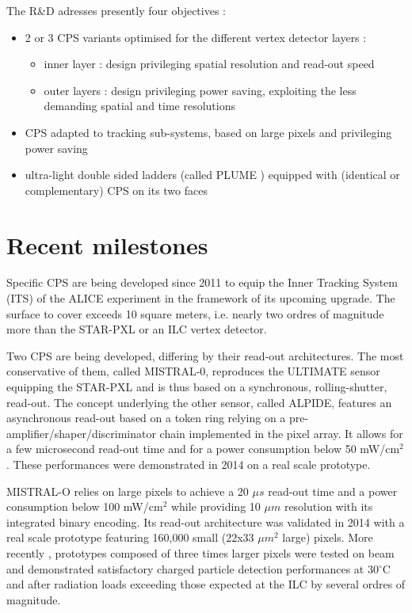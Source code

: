 \documentclass[11pt,a4paper,twosided]{article}
\begin{document}
  The R\&D adresses presently four objectives :
\begin{itemize}
\item 2 or 3 CPS variants optimised for the different vertex detector layers :
\begin{itemize}
\item inner layer : design privileging spatial resolution and read-out speed
\item outer layers : design privileging power saving, exploiting the
                      less demanding spatial and time resolutions 
\end{itemize}
\item CPS adapted to tracking sub-systems, based on large pixels and privileging
      power saving
\item ultra-light double sided ladders (called PLUME \cite{ref:cps4}) 
equipped with (identical or complementary) CPS on its two faces  
\end{itemize}


\section{Recent milestones}

  Specific CPS are being developed since 2011 to equip the Inner Tracking
System (ITS) of the ALICE experiment in the framework of its upcoming 
upgrade. The surface to cover exceeds 10 square meters, i.e. nearly two 
ordres of magnitude more than the STAR-PXL or an ILC vertex detector.

  Two CPS are being developed, differing by their read-out architectures.
The most conservative of them, called MISTRAL-0, reproduces the ULTIMATE 
sensor equipping the STAR-PXL and is thus based on a synchronous, rolling-shutter, read-out. The concept underlying the other sensor, called ALPIDE, features an asynchronous read-out based on a token ring relying on a pre-amplifier/shaper/discriminator chain implemented in the pixel array. It 
allows for a few microsecond read-out time and for a power consumption below 
50 mW/cm$^2$. These performances were demonstrated in 2014 \cite{ref:cps5} 
on a real scale prototype.

  MISTRAL-O relies on large pixels to achieve a 20 $\mu s$ read-out 
time and a power consumption below 100 mW/cm$^2$ while providing 
10 $\mu m$ resolution with its integrated binary encoding. 
Its read-out architecture was validated in 2014 with a real scale 
prototype \cite{ref:cps6} featuring 160,000 small (22x33 $\mu m^2$ 
large) pixels. More recently \cite{ref:cps7}, prototypes composed of 
three times larger pixels were tested on beam and demonstrated satisfactory 
charged particle detection performances at 
30$^{\circ}$C and after radiation loads exceeding those expected at the 
ILC by several ordres of magnitude.    
          
\end{document}
